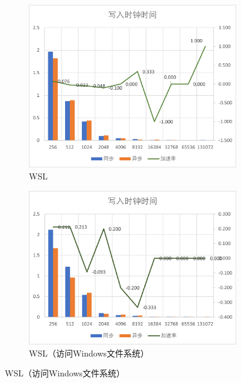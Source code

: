 \documentclass[a4paper,twoside]{article}
\begin{document}
\begin{spacing}{1.2}
\begin{figure}[htbp]
	\centering
	\caption{异步写入加速比较}
	\label{fig:acc}
	\begin{subfigure}{0.4\textwidth}
		\centering
		\includegraphics[width=\textwidth]{sync_async.png}
		\caption{WSL}
		\label{fig:wsl}
	\end{subfigure}
	\begin{subfigure}{0.4\textwidth}
		\centering
		\includegraphics[width=\textwidth]{sync_async_slow.png}
		\caption{WSL（访问Windows文件系统）}
		\label{fig:wslwin}
	\end{subfigure}
\end{figure}


\end{spacing}
\end{document}
